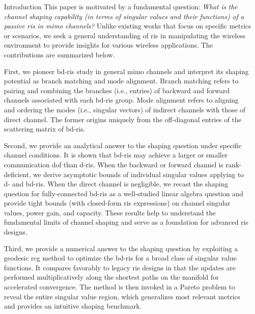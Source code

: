 \documentclass[journal]{IEEEtran}
\begin{document}
\begin{section}{Introduction}
		\label{sc:contributions}
		This paper is motivated by a fundamental question:
		\emph{What is the channel shaping capability (in terms of singular values and their functions) of a passive \gls{ris} in \gls{mimo} channels?}
		Unlike existing works that focus on specific metrics or scenarios, we seek a general understanding of \gls{ris} in manipulating the wireless environment to provide insights for various wireless applications.
		The contributions are summarized below.

		First, we pioneer \gls{bd}-\gls{ris} study in general \gls{mimo} channels and interpret its shaping potential as branch matching and mode alignment.
		Branch matching refers to pairing and combining the branches (i.e., entries) of backward and forward channels associated with each \gls{bd}-\gls{ris} group.
		Mode alignment refers to aligning and ordering the modes (i.e., singular vectors) of indirect channels with those of direct channel.
		The former origins uniquely from the off-diagonal entries of the scattering matrix of \gls{bd}-\gls{ris}.

		Second, we provide an analytical answer to the shaping question under specific channel conditions.
		It is shown that \gls{bd}-\gls{ris} may achieve a larger or smaller communication \gls{dof} than \gls{d}-\gls{ris}.
		When the backward or forward channel is rank-deficient, we derive asymptotic bounds of individual singular values applying to \gls{d}- and \gls{bd}-\gls{ris}.
		When the direct channel is negligible, we recast the shaping question for fully-connected \gls{bd}-\gls{ris} as a well-studied linear algebra question and provide tight bounds (with closed-form \gls{ris} expressions) on channel singular values, power gain, and capacity.
		These results help to understand the fundamental limits of channel shaping and serve as a foundation for advanced \gls{ris} designs.


		Third, we provide a numerical answer to the shaping question by exploiting a geodesic \gls{rcg} method to optimize the \gls{bd}-\gls{ris} for a broad class of singular value functions.
		It compares favorably to legacy \gls{ris} designs in that the updates are performed multiplicatively along the shortest paths on the manifold for accelerated convergence.
		The method is then invoked in a Pareto problem to reveal the entire singular value region, which generalizes most relevant metrics and provides an intuitive shaping benchmark.


\end{section}
\end{document}
